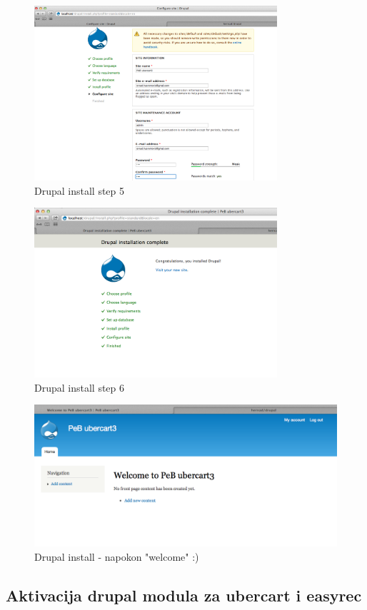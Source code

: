 \documentclass[times, utf8, seminar]{fit}
\begin{document}
{{{\begin{figure}[H]
\centering
\includegraphics[width=9cm]{img/drupal_install_5.png}
\caption{Drupal install step 5}
\end{figure}

\begin{figure}[H]
\centering
\includegraphics[width=9cm]{img/drupal_install_6.png}
\caption{Drupal install step 6}
\end{figure}


\begin{figure}[H]
\centering
\includegraphics[width=12cm]{img/drupal_welcome.png}
\caption{Drupal install - napokon "welcome" :)}
\end{figure}

\subsection{Aktivacija drupal modula za ubercart i easyrec}

}}}
\end{document}
